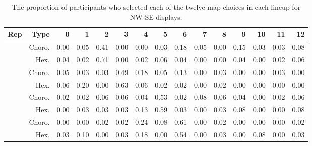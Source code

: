 \documentclass{monashthesis}
\begin{document}
\begin{Shaded}
\begin{Highlighting}[]
{{{{{{{{{{    \NormalTok{, }\NormalTok{, }\NormalTok{))}
\end{Highlighting}
\end{Shaded}

\begin{table}

\caption{\label{tab:choice-nwse}The proportion of participants who selected each of the twelve map choices in each lineup for NW-SE displays.}
\centering
\begin{tabular}[t]{rrrrrrrrrrrrrrr}
\toprule
Rep & Type & 0 & 1 & 2 & 3 & 4 & 5 & 6 & 7 & 8 & 9 & 10 & 11 & 12\\
\midrule
 & Choro. & 0.00 & 0.05 & 0.41 & 0.00 & 0.00 & 0.03 & 0.18 & 0.05 & 0.00 & 0.15 & 0.03 & 0.03 & 0.08\\
\cmidrule{2-15}
\multirow{-2}{*}{\raggedleft\arraybackslash 1} & Hex. & 0.04 & 0.02 & 0.71 & 0.00 & 0.02 & 0.06 & 0.04 & 0.00 & 0.00 & 0.04 & 0.00 & 0.02 & 0.06\\
\cmidrule{1-15}
 & Choro. & 0.05 & 0.03 & 0.03 & 0.49 & 0.18 & 0.05 & 0.13 & 0.00 & 0.03 & 0.00 & 0.00 & 0.03 & 0.00\\
\cmidrule{2-15}
\multirow{-2}{*}{\raggedleft\arraybackslash 2} & Hex. & 0.06 & 0.20 & 0.00 & 0.63 & 0.06 & 0.02 & 0.02 & 0.00 & 0.02 & 0.00 & 0.00 & 0.00 & 0.00\\
\cmidrule{1-15}
 & Choro. & 0.02 & 0.02 & 0.06 & 0.06 & 0.04 & 0.53 & 0.02 & 0.08 & 0.06 & 0.04 & 0.00 & 0.02 & 0.06\\
\cmidrule{2-15}
\multirow{-2}{*}{\raggedleft\arraybackslash 3} & Hex. & 0.00 & 0.03 & 0.03 & 0.03 & 0.13 & 0.59 & 0.03 & 0.00 & 0.03 & 0.08 & 0.00 & 0.00 & 0.08\\
\cmidrule{1-15}
 & Choro. & 0.00 & 0.00 & 0.02 & 0.02 & 0.24 & 0.08 & 0.61 & 0.00 & 0.02 & 0.00 & 0.00 & 0.00 & 0.02\\
\cmidrule{2-15}
\multirow{-2}{*}{\raggedleft\arraybackslash 4} & Hex. & 0.03 & 0.10 & 0.00 & 0.03 & 0.18 & 0.00 & 0.54 & 0.00 & 0.03 & 0.00 & 0.08 & 0.00 & 0.03\\
\bottomrule
\end{tabular}
\end{table}
\end{document}
